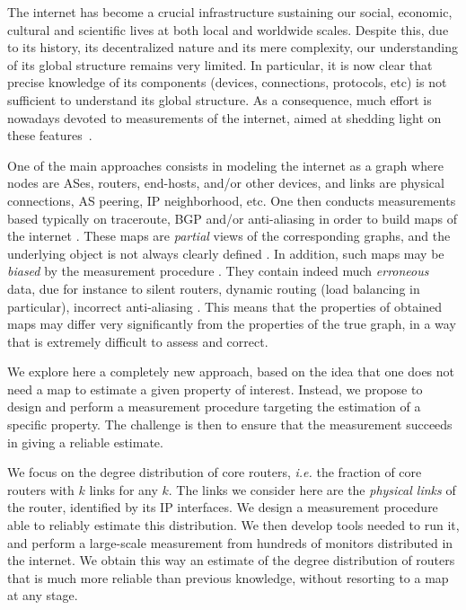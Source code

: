 \documentclass[conference]{IEEEtran}
\begin{document}
The internet has become a crucial infrastructure sustaining our social, economic, cultural and scientific lives at both local and worldwide scales. Despite this, due to its history, its decentralized nature and its mere complexity, our understanding of its global structure remains very limited. In particular, it is now clear that precise knowledge of its components (devices, connections, protocols, etc) is not sufficient to understand its global structure. As a consequence, much effort is nowadays devoted to measurements of the internet, aimed at shedding light on these features~\cite{caida,dimes,iplane,planetlab,ripeatlas}.

One of the main approaches consists in modeling the internet as a graph where nodes are ASes, routers, end-hosts, and/or other devices, and links are physical connections, AS peering, IP neighborhood, etc. One then conducts measurements based typically on traceroute, BGP and/or anti-aliasing in order to build maps of the internet \cite{dimes,routeviews,ripe-ris,caida}. These maps are {\em partial} views of the corresponding graphs, and the underlying object is not always clearly defined \cite{roughan201110}. In addition, such maps may be {\em biased} by the measurement procedure \cite{willinger,DBLP:conf/infocom/LakhinaBCX03,DBLP:journals/jacm/AchlioptasCKM09,DBLP:journals/tcs/DallAstaABVV06,DBLP:journals/cn/GuillaumeLM06,DBLP:conf/infocom/LatapyM08}.  They contain indeed much {\em erroneous} data, due for instance to silent routers, dynamic routing (load balancing in particular), incorrect anti-aliasing \cite{alias-bias,keys2010internet,paristraceroute}. This means that the properties of obtained maps may differ very significantly from the properties of the true graph, in a way that is extremely difficult to assess and correct.

We explore here a completely new approach, based on the idea that one does not need a map to estimate a given property of interest. Instead, we propose to design and perform a measurement procedure targeting the estimation of a specific property. The challenge is then to ensure that the measurement succeeds in giving a reliable estimate.

We focus on the degree distribution of core routers, {\em i.e.} the fraction of core routers with $k$ links for any $k$. The links we consider here are the {\em physical links} of the router, identified by its IP interfaces. We design a measurement procedure able to reliably estimate this distribution. We then develop tools needed to run it, and perform a large-scale measurement from hundreds of monitors distributed in the internet. We obtain this way an estimate of the degree distribution of routers that is much more reliable than previous knowledge, without resorting to a map at any stage.
\end{document}
